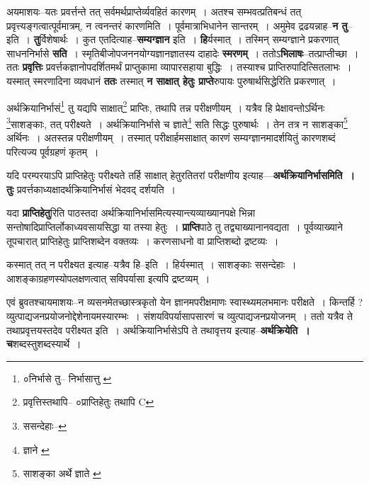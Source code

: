\documentclass[article,12pt,a4paper]{memoir}
\begin{document}
	  \pstart अयमाशयः--यतः प्रवर्त्तन्ते तत् सर्वमर्थप्राप्तेर्व्यवहितं कारणम् । अतश्च सम्भवत्प्रतिबन्धं तत् प्रवृत्त्यङ्गत्वात्पूर्वमात्रम्, न त्वनन्तरं कारणमिति । पूर्वमात्राभिधानेन सान्तरम् । अमुमेव द्रढयन्नाह--\textbf{न तु}--इति । \textbf{तु}र्विशेषार्थः । कुत एतदित्याह--\textbf{सम्यग्ज्ञान} इति । \textbf{हि}र्यस्मात् । तस्मिन् सम्यग्ज्ञाने प्रकरणात् साधननिर्भासे \textbf{सति} । स्मृतिबीजोपजननयोग्यज्ञानज्ञातस्य दाहादेः \textbf{स्मरणम्} । ततोऽ\textbf{भिलाषः}--तत्प्राप्तीच्छा । ततः \textbf{प्रवृत्तिः} प्रवर्त्तकज्ञानोपदर्शितमर्थं प्राप्तुकामा व्यापारसहाया बुद्धिः । तस्याश्च प्राप्तिरुपादित्सितलाभः । यस्मात् स्मरणादिना व्यवधानं \textbf{ततः} तस्मात् \textbf{न साक्षात् हेतुः प्राप्ते}रुपायः पुरुषार्थसिद्धेरिति प्रकरणात् ।
	\pend
	  \bigskip
	  \begingroup
	

	  \pstart अर्थक्रियानिर्भासं\footnote{०निर्भासे तु--\cite{dp-msA} \cite{dp-msC} \cite{dp-edP} \cite{dp-edH} \cite{dp-edN} निर्भासात्तु \cite{dp-msB} \cite{dp-edE} \cite{dp-msD}} तु यद्यपि साक्षात्\footnote{प्रवृत्तिस्तथापि--\cite{dp-msA} \cite{dp-edP} \cite{dp-edH} ०प्राप्तिहेतुः तथापि C} प्राप्तिः, तथापि तन्न परीक्षणीयम् । यत्रैव हि प्रेक्षावन्तोऽर्थिनः \footnote{ससन्देहाः--\cite{dp-msD-n}}\-साशङ्काः, तत् परीक्ष्यते । अर्थक्रियानिर्भासे च ज्ञाते\footnote{ज्ञाने \cite{dp-msB} \cite{dp-edP} \cite{dp-edH}} सति सिद्धः पुरुषार्थः । तेन तत्र न साशङ्का\footnote{साशङ्का अर्थे ज्ञाते \cite{dp-msA} \cite{dp-edP} \cite{dp-edH}} अर्थिनः । अतस्तन्न परीक्षणीयम् । तस्मात् परीक्षार्हमसाक्षात् कारणं सम्यग्ज्ञानमादर्शयितुं कारणशब्दं परित्यज्य पूर्वग्रहणं कृतम् ।
	\pend
      
	  \endgroup
	

	  \pstart यदि परम्परयाऽपि प्राप्तिहेतुः परीक्ष्यते तर्हि साक्षात् हेतुरतितरां परीक्षणीय इत्याह—\textbf{अर्थक्रियानिर्भासमिति । तुः} प्रवर्त्तकाध्यक्षादर्थक्रियानिर्भासं भेदवद् दर्शयति ।
	\pend
      

	  \pstart यदा \textbf{प्राप्तिहेतु}रिति पाठस्तदा अर्थक्रियानिर्भासमित्यस्यान्त्यव्याख्यानपक्षे भिन्ना सन्तोषादिप्राप्तिर्लोकाध्यवसायसिद्धा या तस्या हेतुः । \textbf{प्राप्ति}पाठे तु तद्व्याख्यानानवद्यता । पूर्वव्याख्याने तूपचारात् प्राप्तिहेतुः प्राप्तिशब्देन वक्तव्यः । करणसाधनो वा प्राप्तिशब्दो द्रष्टव्यः ।
	\pend
      

	  \pstart कस्मात् तत् न परीक्ष्यत इत्याह--यत्रैव हि--इति । हिर्यस्मात् । साशङ्काः ससन्देहाः । आशङ्काग्रहणस्योपलक्षणत्वात् सविपर्यासा इत्यपि द्रष्टव्यम् ।
	\pend
      

	  \pstart एवं ब्रुवतश्चायमाशयः--न व्यसनमेतच्छास्त्रकृतो येन ज्ञानमपरीक्षमाणः स्वास्थ्यमलभमानः परीक्षते । किन्तर्हि ? व्युत्पाद्यजनप्रयोजनोद्देशेनायमस्यारम्भः । संशयविपर्यासापसारणं च व्युत्पाद्यजनप्रयोजनम् । ततो यत्रैव ते तथाप्रवृत्तयस्तदेव परीक्ष्यत इति । अर्थक्रियानिर्भासेऽपि ते तथावृत्तय इत्याह--\textbf{अर्थक्रियेति । च}शब्दस्तुशब्दस्यार्थे ।
	\pend
      
\end{document}
